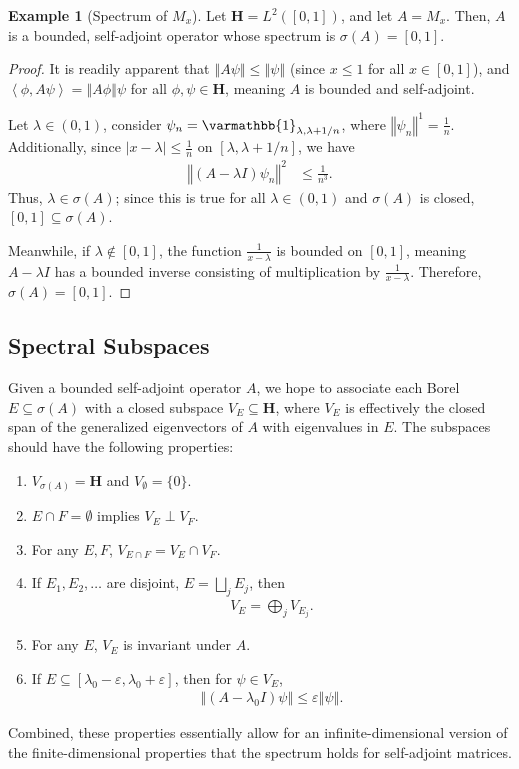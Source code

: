 \documentclass[12pt]{extarticle}
\newcommand{\iprod}[2]{\left\langle #1,#2\right\rangle}
\newcommand{\norm}[1]{\left\Vert #1\right\Vert}
\theoremstyle{plain}
\theoremstyle{definition}
\newtheorem*{example}{Example}
\theoremstyle{remark}
\renewcommand{\newline}{\hfill\break}
\begin{document}
  \begin{example}[Spectrum of $M_x$]
    Let $\mathbf{H} = L^{2}\left([0,1]\right)$, and let $A = M_x$. Then, $A$ is a bounded, self-adjoint operator whose spectrum is $\sigma(A) = [0,1]$.
  \end{example}
  \begin{proof}
    It is readily apparent that $\norm{A\psi} \leq \norm{\psi}$ (since $x\leq 1$ for all $x\in [0,1]$), and $\iprod{\phi}{A\psi} = \norm{A\phi}{\psi}$ for all $\phi,\psi \in \mathbf{H}$, meaning $A$ is bounded and self-adjoint.\newline

    Let $\lambda \in (0,1)$, consider $\psi_n = \varmathbb{1}_{\lambda,\lambda + 1/n}$, where $\norm{\psi_n}^1 = \frac{1}{n}$. Additionally, since $|x - \lambda| \leq \frac{1}{n}$ on $[\lambda,\lambda + 1/n]$, we have
    \begin{align*}
      \norm{(A - \lambda I)\psi_n}^2 &\leq \frac{1}{n^3}.
    \end{align*}
    Thus, $\lambda \in \sigma(A)$; since this is true for all $\lambda \in (0,1)$ and $\sigma(A)$ is closed, $[0,1]\subseteq \sigma(A)$.\newline

    Meanwhile, if $\lambda \notin [0,1]$, the function $\frac{1}{x - \lambda}$ is bounded on $[0,1]$, meaning $A - \lambda I$ has a bounded inverse consisting of multiplication by $\frac{1}{x - \lambda}$. Therefore,$\sigma(A) = [0,1]$.
  \end{proof}
  \subsection{Spectral Subspaces}%
  Given a bounded self-adjoint operator $A$, we hope to associate each Borel $E\subseteq \sigma(A)$ with a closed subspace $V_E\subseteq \mathbf{H}$, where $V_E$  is effectively the closed span of the generalized eigenvectors of $A$ with eigenvalues in $E$. The subspaces should have the following properties:
  \begin{enumerate}[(1)]
    \item $V_{\sigma(A)} = \mathbf{H}$ and $V_{\emptyset} = \{0\}$.
    \item $E\cap F = \emptyset$ implies $V_E \perp V_F$.
    \item For any $E,F$, $V_{E\cap F} = V_E \cap V_F$.
    \item If $E_1,E_2,\dots$ are disjoint, $E = \bigsqcup_{j}E_j$, then
      \begin{align*}
        V_E = \bigoplus_{j} V_{E_j}.
      \end{align*}
    \item For any $E$, $V_E$ is invariant under $A$.
    \item If $E\subseteq [\lambda_0 - \varepsilon, \lambda_0 + \varepsilon]$, then for $\psi \in V_E$,
      \begin{align*}
        \norm{\left(A - \lambda_0 I\right)\psi} \leq \varepsilon \norm{\psi}.
      \end{align*}
  \end{enumerate}
  Combined, these properties essentially allow for an infinite-dimensional version of the finite-dimensional properties that the spectrum holds for self-adjoint matrices.
\end{document}
